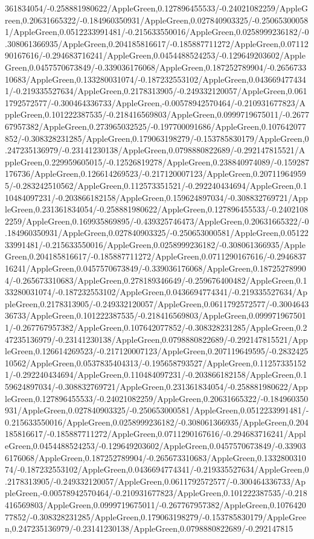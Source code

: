 {\begin{tikzternal}
{361834054/-0.258881980622/AppleGreen,0.127896455533/-0.24021082259/AppleGreen,0.20631665322/-0.184960350931/AppleGreen,0.027840903325/-0.250653000581/AppleGreen,0.0512233991481/-0.215633550016/AppleGreen,0.0258999236182/-0.308061366935/AppleGreen,0.204185816617/-0.185887711272/AppleGreen,0.0711290167616/-0.294683716241/AppleGreen,0.0454488524253/-0.129649203602/AppleGreen,0.0457570673849/-0.339036176068/AppleGreen,0.187252789904/-0.265673310683/AppleGreen,0.133280031074/-0.187232553102/AppleGreen,0.0436694774341/-0.219335527634/AppleGreen,0.2178313905/-0.249332120057/AppleGreen,0.0611792572577/-0.300464336733/AppleGreen,-0.00578942570464/-0.210931677823/AppleGreen,0.101222387535/-0.218416569803/AppleGreen,0.0999719675011/-0.267767957382/AppleGreen,0.273965032525/-0.197700091686/AppleGreen,0.107642077852/-0.308328231285/AppleGreen,0.179063198279/-0.153785830179/AppleGreen,0.247235136979/-0.23141230138/AppleGreen,0.0798880822689/-0.292147815521/AppleGreen,0.229959605015/-0.12526819278/AppleGreen,0.238840974089/-0.159287176736/AppleGreen,0.126614269523/-0.217120007123/AppleGreen,0.207119649595/-0.283242510562/AppleGreen,0.112573351521/-0.292240434694/AppleGreen,0.110484097231/-0.203866182158/AppleGreen,0.159624897034/-0.308832769721/AppleGreen,0.231361834054/-0.258881980622/AppleGreen,0.127896455533/-0.24021082259/AppleGreen,0.169935869895/-0.439325746473/AppleGreen,0.20631665322/-0.184960350931/AppleGreen,0.027840903325/-0.250653000581/AppleGreen,0.0512233991481/-0.215633550016/AppleGreen,0.0258999236182/-0.308061366935/AppleGreen,0.204185816617/-0.185887711272/AppleGreen,0.0711290167616/-0.294683716241/AppleGreen,0.0457570673849/-0.339036176068/AppleGreen,0.187252789904/-0.265673310683/AppleGreen,0.278189346649/-0.259676400482/AppleGreen,0.133280031074/-0.187232553102/AppleGreen,0.0436694774341/-0.219335527634/AppleGreen,0.2178313905/-0.249332120057/AppleGreen,0.0611792572577/-0.300464336733/AppleGreen,0.101222387535/-0.218416569803/AppleGreen,0.0999719675011/-0.267767957382/AppleGreen,0.107642077852/-0.308328231285/AppleGreen,0.247235136979/-0.23141230138/AppleGreen,0.0798880822689/-0.292147815521/AppleGreen,0.126614269523/-0.217120007123/AppleGreen,0.207119649595/-0.283242510562/AppleGreen,0.0537835404313/-0.195658793527/AppleGreen,0.112573351521/-0.292240434694/AppleGreen,0.110484097231/-0.203866182158/AppleGreen,0.159624897034/-0.308832769721/AppleGreen,0.231361834054/-0.258881980622/AppleGreen,0.127896455533/-0.24021082259/AppleGreen,0.20631665322/-0.184960350931/AppleGreen,0.027840903325/-0.250653000581/AppleGreen,0.0512233991481/-0.215633550016/AppleGreen,0.0258999236182/-0.308061366935/AppleGreen,0.204185816617/-0.185887711272/AppleGreen,0.0711290167616/-0.294683716241/AppleGreen,0.0454488524253/-0.129649203602/AppleGreen,0.0457570673849/-0.339036176068/AppleGreen,0.187252789904/-0.265673310683/AppleGreen,0.133280031074/-0.187232553102/AppleGreen,0.0436694774341/-0.219335527634/AppleGreen,0.2178313905/-0.249332120057/AppleGreen,0.0611792572577/-0.300464336733/AppleGreen,-0.00578942570464/-0.210931677823/AppleGreen,0.101222387535/-0.218416569803/AppleGreen,0.0999719675011/-0.267767957382/AppleGreen,0.107642077852/-0.308328231285/AppleGreen,0.179063198279/-0.153785830179/AppleGreen,0.247235136979/-0.23141230138/AppleGreen,0.0798880822689/-0.292147815}
\end{tikzternal}}

